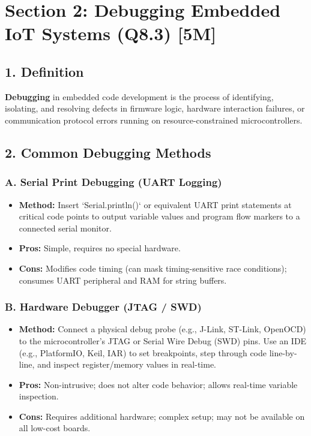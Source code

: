 \section{Section 2: Debugging Embedded IoT Systems (Q8.3) [5M]}

\subsection{1. Definition}
\textbf{Debugging} in embedded code development is the process of identifying, isolating, and resolving defects in firmware logic, hardware interaction failures, or communication protocol errors running on resource-constrained microcontrollers.


\subsection{2. Common Debugging Methods}

\subsubsection{A. Serial Print Debugging (UART Logging)}
\begin{itemize}
  \item   \textbf{Method:} Insert `Serial.println()` or equivalent UART print statements at critical code points to output variable values and program flow markers to a connected serial monitor.
  \item   \textbf{Pros:} Simple, requires no special hardware.
  \item   \textbf{Cons:} Modifies code timing (can mask timing-sensitive race conditions); consumes UART peripheral and RAM for string buffers.
\end{itemize}

\subsubsection{B. Hardware Debugger (JTAG / SWD)}
\begin{itemize}
  \item   \textbf{Method:} Connect a physical debug probe (e.g., J-Link, ST-Link, OpenOCD) to the microcontroller's JTAG or Serial Wire Debug (SWD) pins. Use an IDE (e.g., PlatformIO, Keil, IAR) to set breakpoints, step through code line-by-line, and inspect register/memory values in real-time.
  \item   \textbf{Pros:} Non-intrusive; does not alter code behavior; allows real-time variable inspection.
  \item   \textbf{Cons:} Requires additional hardware; complex setup; may not be available on all low-cost boards.
\end{itemize}

